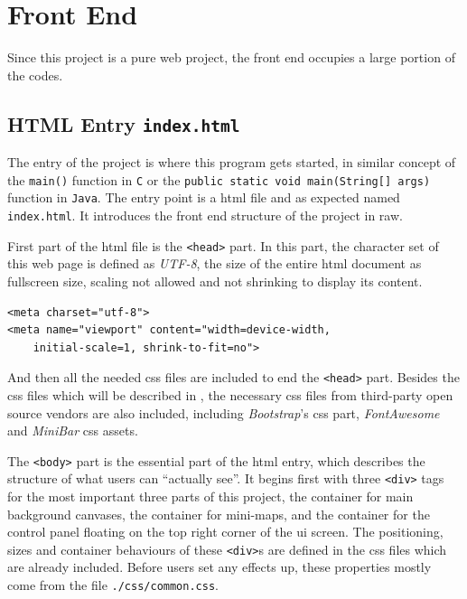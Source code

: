 
\section{Front End}

Since this project is a pure web project, the front end occupies a large portion of the codes.

\subsection{HTML Entry \texttt{index.html}}

The entry of the project is where this program gets started, in similar concept of the \texttt{main()} function in \texttt{C} or the \texttt{public static void main(String[] args)} function in \texttt{Java}. The entry point is a \gls{html} file and as expected named \texttt{index.html}. It introduces the front end structure of the project in raw.

First part of the \gls{html} file is the \texttt{<head>} part. In this part, the character set of this web page is defined as \emph{UTF-8}, the size of the entire \gls{html} document as fullscreen size, scaling not allowed and not shrinking to display its content.

\begin{verbatim}
<meta charset="utf-8">
<meta name="viewport" content="width=device-width,
    initial-scale=1, shrink-to-fit=no">
\end{verbatim}

And then all the needed \gls{css} files are included to end the \texttt{<head>} part. Besides the \gls{css} files which will be described in , the necessary \gls{css} files from third-party open source vendors are also included, including \emph{Bootstrap}'s \gls{css} part, \emph{FontAwesome} and \emph{MiniBar} \gls{css} assets.

The \texttt{<body>} part is the essential part of the \gls{html} entry, which describes the structure of what users can ``actually see''. It begins first with three \texttt{<div>} tags for the most important three parts of this project, the container for main background canvases, the container for mini-maps, and the container for the control panel floating on the top right corner of the \gls{ui} screen. The positioning, sizes and container behaviours of these \texttt{<div>}s are defined in the \gls{css} files which are already included. Before users set any effects up, these properties mostly come from the file \texttt{./css/common.css}.

